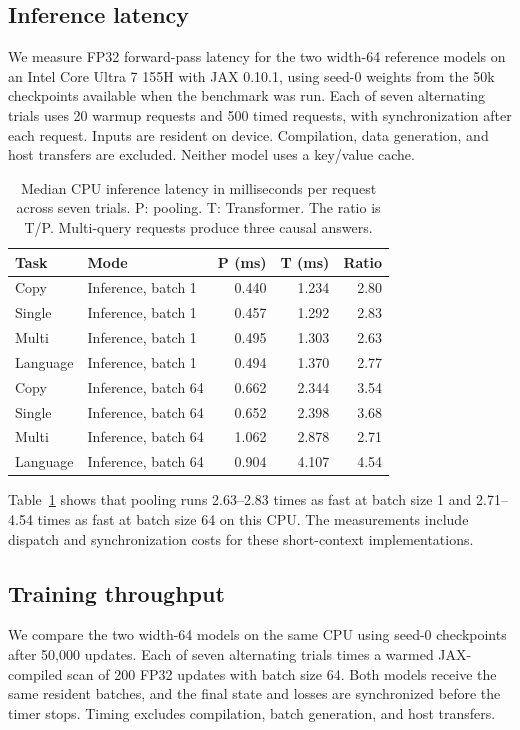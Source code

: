 \documentclass[11pt]{article}
\begin{document}
\subsection{Inference latency}
We measure FP32 forward-pass latency for the two width-64 reference models on an Intel Core Ultra 7 155H with JAX 0.10.1, using seed-0 weights from the 50k checkpoints available when the benchmark was run. Each of seven alternating trials uses 20 warmup requests and 500 timed requests, with synchronization after each request. Inputs are resident on device. Compilation, data generation, and host transfers are excluded. Neither model uses a key/value cache.

\begin{table}[htbp]
\centering\small
\caption{Median CPU inference latency in milliseconds per request across seven trials. P: pooling. T: Transformer. The ratio is T/P. Multi-query requests produce three causal answers.}
\label{tab:speed}
\begin{tabular}{llrrr}
\toprule
Task & Mode & P (ms) & T (ms) & Ratio\\
\midrule
Copy & Inference, batch 1 & 0.440 & 1.234 & 2.80\\
Single & Inference, batch 1 & 0.457 & 1.292 & 2.83\\
Multi & Inference, batch 1 & 0.495 & 1.303 & 2.63\\
Language & Inference, batch 1 & 0.494 & 1.370 & 2.77\\
\midrule
Copy & Inference, batch 64 & 0.662 & 2.344 & 3.54\\
Single & Inference, batch 64 & 0.652 & 2.398 & 3.68\\
Multi & Inference, batch 64 & 1.062 & 2.878 & 2.71\\
Language & Inference, batch 64 & 0.904 & 4.107 & 4.54\\
\bottomrule
\end{tabular}
\end{table}

Table~\ref{tab:speed} shows that pooling runs 2.63--2.83 times as fast at batch size 1 and 2.71--4.54 times as fast at batch size 64 on this CPU. The measurements include dispatch and synchronization costs for these short-context implementations.

\subsection{Training throughput}
We compare the two width-64 models on the same CPU using seed-0 checkpoints after 50,000 updates. Each of seven alternating trials times a warmed JAX-compiled scan of 200 FP32 updates with batch size 64. Both models receive the same resident batches, and the final state and losses are synchronized before the timer stops. Timing excludes compilation, batch generation, and host transfers.
\end{document}
